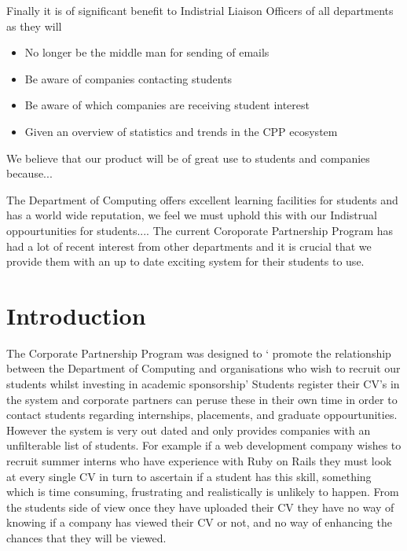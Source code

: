\documentclass{article}
\begin{document}
Finally it is of significant benefit to Indistrial Liaison Officers of all departments as they will

\begin{itemize}
  \item No longer be the middle man for sending of emails
  \item Be aware of companies contacting students
  \item Be aware of which companies are receiving student interest
  \item Given an overview of statistics and trends in the CPP ecosystem
\end{itemize}

We believe that our product will be of great use to students and companies because...

The Department of Computing offers excellent learning facilities for students and has a world wide reputation, we feel we must uphold this with our Indistrual oppourtunities for students....
The current Coroporate Partnership Program has had a lot of recent interest from other departments and it is crucial that we provide them with an up to date exciting system for their students to use.





\section{Introduction}
The Corporate Partnership Program was designed to ` promote the relationship between the Department of Computing and organisations who wish to recruit our students whilst investing in academic sponsorship' 
Students register their CV's in the system and corporate partners can peruse these in their own time in order to contact students regarding internships, placements, and graduate oppourtunities.
However the system is very out dated and only provides companies with an unfilterable list of students. For example if a web development company wishes to recruit summer interns who have experience with Ruby on Rails they must look at every single CV in turn to ascertain if a student has this skill, something which is time consuming, frustrating and realistically is unlikely to happen.
From the students side of view once they have uploaded their CV they have no way of knowing if a company has viewed their CV or not, and no way of enhancing the chances that they will be viewed.
\end{document}

